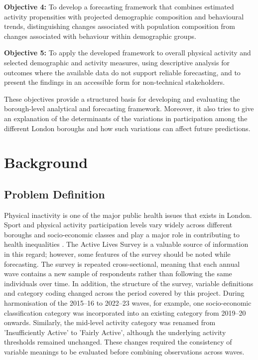 \documentclass[ %
                    author={Ashrey Ashrey, Sanya Kapoor, Trisha Sharma, Yash Bhooshan Pandloskar},
                supervisor={Dr. Dalila O’Grady},
                    degree={MSc},
                     title={Using machine learning to forecast physical activity participation, volunteering and activity patterns in London},
                  subtitle={},
                      type={},
                      year={2021}]{dissertation}
\begin{document}
\textbf{Objective 4:} To develop a forecasting framework that combines estimated activity propensities with projected demographic composition and behavioural trends, distinguishing changes associated with population composition from changes associated with behaviour within demographic groups.

\textbf{Objective 5:} To apply the developed framework to overall physical activity and selected demographic and activity measures, using descriptive analysis for outcomes where the available data do not support reliable forecasting, and to present the findings in an accessible form for non-technical stakeholders.

These objectives provide a structured basis for developing and evaluating the borough-level analytical and forecasting framework. Moreover, it also tries to give an explanation of the determinants of the variations in participation among the different London boroughs and how such variations can affect future predictions.


\chapter{Background}
\label{chap:background}

\section{Problem Definition}

Physical inactivity is one of the major public health issues that exists in London. Sport and physical activity participation levels vary widely across different boroughs and socio-economic classes and play a major role in contributing to health inequalities \cite{choe_lee_kang_2025}. The Active Lives Survey is a valuable source of information in this regard; however, some features of the survey should be noted while forecasting. The survey is repeated cross-sectional, meaning that each annual wave contains a new sample of respondents rather than following the same individuals over time. In addition, the structure of the survey, variable definitions and category coding changed across the period covered by this project. During harmonisation of the 2015--16 to 2022--23 waves, for example, one socio-economic classification category was incorporated into an existing category from 2019--20 onwards. Similarly, the mid-level activity category was renamed from 'Insufficiently Active' to 'Fairly Active', although the underlying activity thresholds remained unchanged. These changes required the consistency of variable meanings to be evaluated before combining observations across waves.
\end{document}
